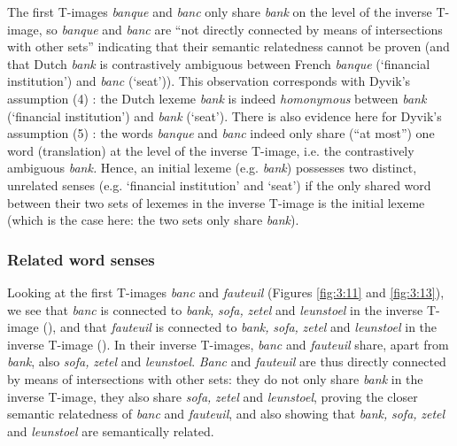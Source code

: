The first T-images \textit{banque} and \textit{banc} only share \textit{bank} on the level of the inverse T-image, so \textit{banque} and \textit{banc} are “not directly connected by means of intersections with other sets” \citep[32]{langemets_translations_2005} indicating that their semantic relatedness cannot be proven (and that Dutch \textit{bank} is contrastively ambiguous between French \textit{banque} (`financial institution') and \textit{banc} (`seat')). This observation corresponds with Dyvik’s assumption (4) \citep[31--32]{langemets_translations_2005}: the Dutch lexeme \textit{bank} is indeed \textit{homonymous} between \textit{bank} (`financial institution') and \textit{bank} (`seat'). There is also evidence here for Dyvik’s assumption (5) \citep[31--32]{langemets_translations_2005}: the words \textit{banque} and \textit{banc} indeed only share (“at most”) one word (translation) at the level of the inverse T-image, i.e. the contrastively ambiguous \textit{bank.} Hence, an initial lexeme (e.g. \textit{bank}) possesses two distinct, unrelated senses (e.g. `financial institution' and `seat') if the only shared word between their two sets of lexemes in the inverse T-image is the initial lexeme (which is the case here: the two sets only share \textit{bank}).

\subsubsection{Related word senses}
\label{sec:3.4.3.2}
Looking at the first T-images \textit{banc} and \textit{fauteuil} (Figures \ref{fig:3:11} and \ref{fig:3:13}), we see that \textit{banc} is connected to \textit{bank,} \textit{sofa,} \textit{zetel} and \textit{leunstoel} in the inverse T-image (), and that \textit{fauteuil} is connected to \textit{bank,} \textit{sofa,} \textit{zetel} and \textit{leunstoel} in the inverse T-image (). In their inverse T-images, \textit{banc} and \textit{fauteuil} share, apart from \textit{bank}, also \textit{sofa,} \textit{zetel} and \textit{leunstoel}. \textit{Banc} and \textit{fauteuil} are thus directly connected by means of intersections with other sets: they do not only share \textit{bank} in the inverse T-image, they also share \textit{sofa,} \textit{zetel} and \textit{leunstoel}, proving the closer semantic relatedness of \textit{banc} and \textit{fauteuil}, and also showing that \textit{bank,} \textit{sofa,} \textit{zetel} and \textit{leunstoel} are semantically related.

